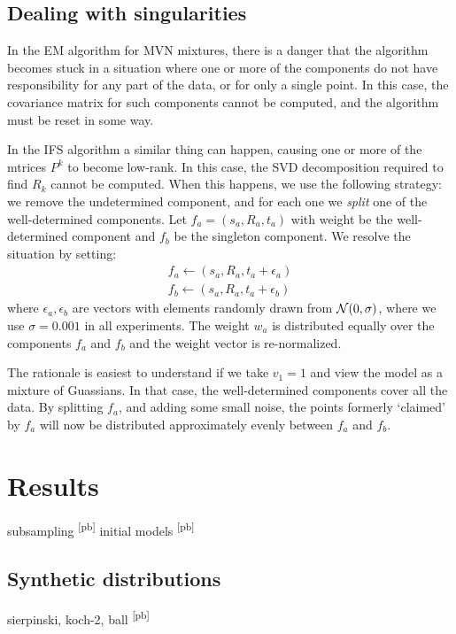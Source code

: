 \documentclass[10pt,a4paper,oneside]{article}
\theoremstyle{definition}
\newcommand{\cN}{{\cal N}}
\theoremstyle{definition}
\newcommand{\pb}[1]{\textcolor{OliveGreen}{\small #1 \textsuperscript{[pb]} }}
\begin{document}
\subsection{Dealing with singularities}

In the EM algorithm for MVN mixtures, there is a danger that the algorithm becomes stuck in a situation where one or more of the components do not have responsibility for any part of the data, or for only a single point. In this case, the covariance matrix for such components cannot be computed, and the algorithm must be reset in some way.

In the IFS algorithm a similar thing can happen, causing one or more of the mtrices $P^k$ to become low-rank. In this case, the SVD decomposition required to find $R_k$ cannot be computed. When this happens, we use the following strategy: we remove the undetermined component, and for each one we \emph{split} one of the well-determined components. Let $f_a = (s_a, R_a, t_a)$ with weight be the well-determined component and $f_b$ be the singleton component. We resolve the situation by setting:
\begin{align*}
f_a \leftarrow (s_a, R_a, t_a + \epsilon_a)\\
f_b \leftarrow (s_a, R_a, t_a + \epsilon_b) 
\end{align*}
where $\epsilon_a, \epsilon_b$ are vectors with elements randomly drawn from $\cN(0, \sigma)$, where we use $\sigma = 0.001$ in all experiments. The weight $w_a$ is distributed equally over the components $f_a$ and $f_b$ and the weight vector is re-normalized.
 
The rationale is easiest to understand if we take $v_1=1$ and view the model as a mixture of Guassians. In that case, the well-determined components cover all the data. By splitting $f_a$, and adding some small noise, the points formerly `claimed' by $f_a$ will now be distributed approximately evenly between $f_a$ and $f_b$. 

\section{Results}
\pb{subsampling}
\pb{initial models}

\label{section:experiments}

\subsection{Synthetic distributions}

\pb{sierpinski, koch-2, ball}
\end{document}
